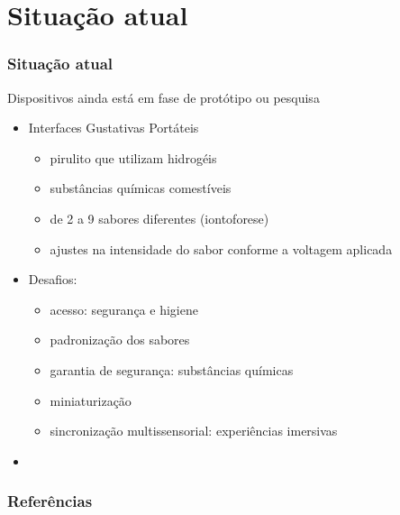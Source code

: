 \documentclass{beamer}
\begin{document}
\section{Situação atual}
\begin{frame}
  \frametitle{Situação atual}
  Dispositivos ainda está em fase de protótipo ou pesquisa \\
  \begin{itemize}
    \item Interfaces Gustativas Portáteis
    \begin{itemize}
      \item pirulito que utilizam hidrogéis
      \item substâncias químicas comestíveis
      \item de 2 a 9 sabores diferentes (iontoforese)
      \item ajustes na intensidade do sabor conforme a voltagem aplicada
    \end{itemize}
    \item Desafios:
    \begin{itemize}
      \item acesso: segurança e higiene
      \item padronização dos sabores
      \item garantia de segurança: substâncias químicas
      \item miniaturização
      \item sincronização multissensorial: experiências imersivas
    \end{itemize}
    \item \cite{reisTrabalho4Interfaces2025}
  \end{itemize}
\end{frame}



\begin{frame}
  \frametitle{Referências}
  \begingroup
  \footnotesize
    
    
  \endgroup
\end{frame}
\end{document}
